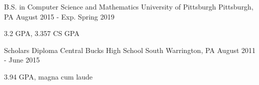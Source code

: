 
\vspace{0mm}
\begin{cventries}

  \cventry
    {B.S. in Computer Science and Mathematics} %
    {University of Pittsburgh} %
    {Pittsburgh, PA} %
    {August 2015 - Exp. Spring 2019} %
    {
      \begin{cvitems} %
        \item {3.2 GPA, 3.357 CS GPA}
      \end{cvitems}
    }
    
  \cventry
  	{Scholars Diploma} %
    {Central Bucks High School South} %
    {Warrington, PA} %
    {August 2011 - June 2015} %
    {
      \begin{cvitems} %
        \item {3.94 GPA, magna cum laude}
      \end{cvitems}
    }
	 
  \vspace{-6mm}
  
\end{cventries}
